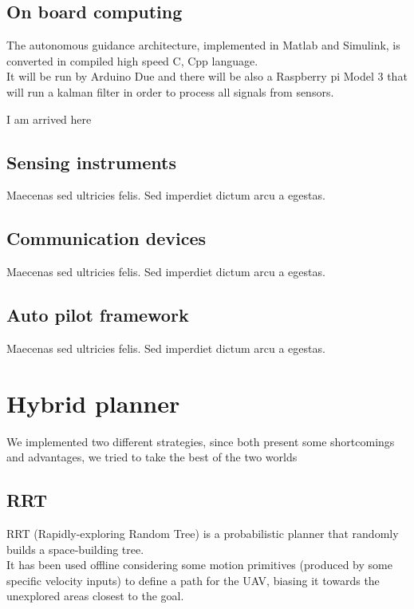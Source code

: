 \documentclass[oneside,onecolumn]{article}
\begin{document}
\subsection{On board computing}
The autonomous guidance architecture, implemented in Matlab and Simulink, is
converted in compiled high speed C, Cpp language.\\ It will be run by Arduino Due
and there will be also a Raspberry pi Model 3 that will run a kalman filter in
order to process all signals from sensors.

\bigskip I am arrived here  %


\subsection{Sensing instruments}
Maecenas sed ultricies felis. Sed imperdiet dictum arcu a egestas. 
\subsection{Communication devices}
Maecenas sed ultricies felis. Sed imperdiet dictum arcu a egestas. 
\subsection{Auto pilot framework}
Maecenas sed ultricies felis. Sed imperdiet dictum arcu a egestas. 
\section{Hybrid planner}
We implemented two different strategies, since both present some shortcomings
and advantages, we tried to take the best of the two worlds

\subsection{RRT}
RRT (Rapidly-exploring Random Tree) is a probabilistic planner that randomly builds a space-building tree.\\
It has been used offline considering some motion primitives (produced by some specific velocity inputs) to define a path for the UAV, biasing it towards the unexplored areas closest to the goal.
\end{document}
